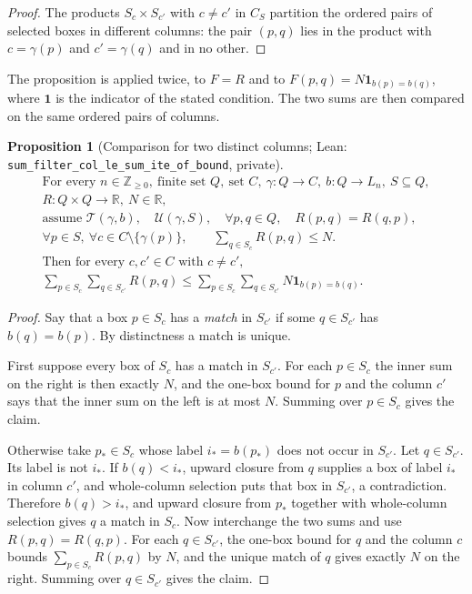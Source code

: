 \documentclass[11pt]{amsart}
\newcommand{\lean}[1]{\texttt{#1}}
\newtheorem{proposition}{Proposition}
\theoremstyle{definition}
\theoremstyle{remark}
\begin{document}
\begin{proof}
The products \(S_c\times S_{c'}\) with \(c\ne c'\) in \(C_S\) partition the
ordered pairs of selected boxes in different columns: the pair \((p,q)\) lies
in the product with \(c=\gamma(p)\) and \(c'=\gamma(q)\) and in no other.
\end{proof}

The proposition is applied twice, to \(F=R\) and to
\(F(p,q)=N\mathbf 1_{b(p)=b(q)}\), where \(\mathbf 1\) is the indicator of the
stated condition. The two sums are then compared on the same ordered pairs
of columns.

\begin{proposition}[Comparison for two distinct columns; Lean: \lean{sum\_\allowbreak{}filter\_\allowbreak{}col\_\allowbreak{}le\_\allowbreak{}sum\_\allowbreak{}ite\_\allowbreak{}of\_\allowbreak{}bound}, private]\label{prop:7}
\[
\begin{gathered}
\text{For every }n\in\mathbb Z_{\ge0},\ \text{finite set }Q,\ \text{set }C,\
\gamma:Q\to C,\ b:Q\to L_n,\ S\subseteq Q,\\
R:Q\times Q\to\mathbb R,\ N\in\mathbb R,\\
\text{assume }\mathcal T(\gamma,b),\quad\mathcal U(\gamma,S),\quad
\forall p,q\in Q,\quad R(p,q)=R(q,p),\\
\forall p\in S,\ \forall c\in C\setminus\{\gamma(p)\},\qquad
\sum_{q\in S_c}R(p,q)\le N.
\\
\text{Then for every }c,c'\in C\text{ with }c\ne c',\\
\sum_{p\in S_c}\sum_{q\in S_{c'}}R(p,q)
\le\sum_{p\in S_c}\sum_{q\in S_{c'}}N\mathbf 1_{b(p)=b(q)} .
\end{gathered}
\]
\end{proposition}

\begin{proof}
Say that a box \(p\in S_c\) has a \emph{match} in \(S_{c'}\) if some
\(q\in S_{c'}\) has \(b(q)=b(p)\). By distinctness a match is unique.

First suppose every box of \(S_c\) has a match in \(S_{c'}\). For each
\(p\in S_c\) the inner sum on the right is then exactly \(N\), and the
one-box bound for \(p\) and the column \(c'\) says that the inner sum on the
left is at most \(N\). Summing over \(p\in S_c\) gives the claim.

Otherwise take \(p_*\in S_c\) whose label \(i_*=b(p_*)\) does not occur in
\(S_{c'}\). Let \(q\in S_{c'}\). Its label is not \(i_*\). If \(b(q)<i_*\),
upward closure from \(q\) supplies a box of label \(i_*\) in column \(c'\),
and whole-column selection puts that box in \(S_{c'}\), a contradiction.
Therefore \(b(q)>i_*\), and upward closure from \(p_*\) together with
whole-column selection gives \(q\) a match in \(S_c\). Now interchange the
two sums and use \(R(p,q)=R(q,p)\). For each \(q\in S_{c'}\), the one-box
bound for \(q\) and the column \(c\) bounds \(\sum_{p\in S_c}R(p,q)\) by
\(N\), and the unique match of \(q\) gives exactly \(N\) on the right.
Summing over \(q\in S_{c'}\) gives the claim.
\end{proof}
\end{document}
